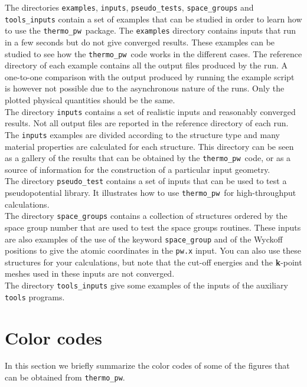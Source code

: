 \documentclass[12pt,a4paper]{article}
\def\thermo{\texttt{thermo\_pw}}
\begin{document}
The directories \texttt{examples}, \texttt{inputs}, \texttt{pseudo\_tests}, 
\texttt{space\_groups} and \texttt{tools\_inputs} contain a set
of examples that can be studied in order to learn how to use the \thermo\ 
package. The \texttt{examples} directory contains inputs that run in a few
seconds but do not give converged results. These examples can be studied 
to see how the \thermo\ code works in the different cases. The
reference directory of each example contains all the output
files produced by the run. A one-to-one comparison with the output
produced by running the example script is however not possible due to the
asynchronous nature of the runs. Only the plotted physical quantities 
should be the same. \\
The directory \texttt{inputs} contains a set
of realistic inputs and reasonably converged results. Not all
output files are reported in the reference directory of each run.
The \texttt{inputs} examples are divided according to the structure type
and many material properties are calculated for each structure.
This directory can be seen as a gallery of the results that can be
obtained by the \thermo\ code, or as a source of information for the
construction of a particular input geometry. \\
The directory \texttt{pseudo\_test} contains a set of inputs that can
be used to test a pseudopotential library. It illustrates how to use \thermo\ 
for high-throughput calculations. \\
The directory \texttt{space\_groups} contains a collection of structures
ordered by the space group number that are used to test the space
groups routines. These inputs are also examples of the use of the
keyword \texttt{space\_group} and of the Wyckoff positions to give the
atomic coordinates in the \texttt{pw.x} input. You can also use these
structures for your calculations, but note that the cut-off energies and
the {\bf k}-point meshes used in these inputs are not converged. \\
The directory \texttt{tools\_inputs} give some examples of the inputs of
the auxiliary \texttt{tools} programs.



\newpage
\section{\color{coral}Color codes}

In this section we briefly summarize the color codes of some of the figures
that can be obtained from \texttt{thermo\_pw}.
\end{document}
